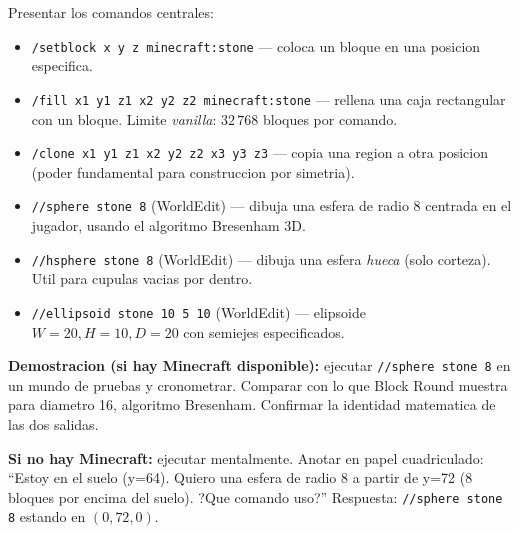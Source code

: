\documentclass[12pt,a4paper]{scrartcl}
\newcommand{\cmd}[1]{\textcolor{earth}{\texttt{\small #1}}}
\newcommand{\tempo}[1]{\textnormal{\footnotesize\color{bg!90!white}\textsf{#1}}}
\begin{document}
\begin{actividad}[4.2 --- Comandos Minecraft \quad\tempo{15 min}]\label{at:42}
Presentar los comandos centrales:

\begin{itemize}[leftmargin=1.4em,itemsep=0.25em,topsep=0.3em]
  \item \cmd{/setblock x y z minecraft:stone} --- coloca un bloque en una posicion especifica.
  \item \cmd{/fill x1 y1 z1 x2 y2 z2 minecraft:stone} --- rellena una caja rectangular con un bloque. Limite \emph{vanilla}: $32\,768$ bloques por comando.
  \item \cmd{/clone x1 y1 z1 x2 y2 z2 x3 y3 z3} --- copia una region a otra posicion (poder fundamental para construccion por simetria).
  \item \cmd{//sphere stone 8} (WorldEdit) --- dibuja una esfera de radio 8 centrada en el jugador, usando el algoritmo Bresenham 3D.
  \item \cmd{//hsphere stone 8} (WorldEdit) --- dibuja una esfera \emph{hueca} (solo corteza). Util para cupulas vacias por dentro.
  \item \cmd{//ellipsoid stone 10 5 10} (WorldEdit) --- elipsoide $W = 20, H = 10, D = 20$ con semiejes especificados.
\end{itemize}

\textbf{Demostracion (si hay Minecraft disponible):} ejecutar \cmd{//sphere stone 8} en un mundo de pruebas y cronometrar. Comparar con lo que Block Round muestra para diametro 16, algoritmo Bresenham. Confirmar la identidad matematica de las dos salidas.

\textbf{Si no hay Minecraft:} ejecutar mentalmente. Anotar en papel cuadriculado: \enquote{Estoy en el suelo (y=64). Quiero una esfera de radio 8 a partir de y=72 (8 bloques por encima del suelo). ?Que comando uso?} Respuesta: \cmd{//sphere stone 8} estando en $(0, 72, 0)$.
\end{actividad}
\end{document}
